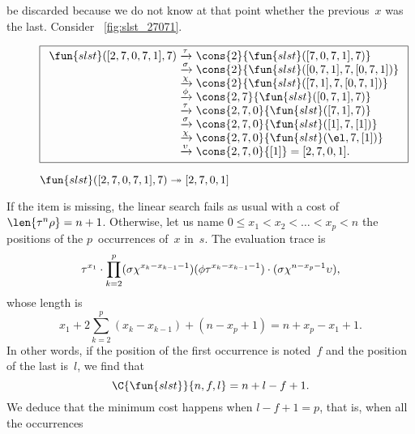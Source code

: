 be discarded because we do not know at that point whether the
previous~\(x\) was the last. Consider \fig~\vref{fig:slst_27071}.
\begin{figure}
\begin{equation*}
\boxed{%
\begin{array}{r@{\;}l@{\;}l}
\fun{slst}([2,7,0,7,1],7)
& \xrightarrow{\smash{\tau}}
& \cons{2}{\fun{slst}([7,0,7,1],7)}\\
& \xrightarrow{\smash{\sigma}}
& \cons{2}{\fun{slst}([0,7,1],7,[0,7,1])}\\
& \xrightarrow{\smash{\chi}}
& \cons{2}{\fun{slst}([7,1],7,[0,7,1])}\\
& \xrightarrow{\smash{\phi}}
& \cons{2,7}{\fun{slst}([0,7,1],7)}\\
& \xrightarrow{\smash{\tau}}
& \cons{2,7,0}{\fun{slst}([7,1],7)}\\
& \xrightarrow{\smash{\sigma}}
& \cons{2,7,0}{\fun{slst}([1],7,[1])}\\
& \xrightarrow{\smash{\chi}}
& \cons{2,7,0}{\fun{slst}(\el,7,[1])}\\
& \xrightarrow{\smash{\upsilon}}
& \cons{2,7,0}{[1]} = [2,7,0,1].
\end{array}}
\end{equation*}
\caption{\(\fun{slst}([2,7,0,7,1],7) \twoheadrightarrow [2,7,0,1]\)}
\label{fig:slst_27071}
\end{figure}
If the item is missing, the linear search fails as usual with a cost
of \(\len{\tau^n\rho} = n + 1\). Otherwise, let us name \( 0 \leqslant
x_1 < x_2 < \dots < x_p < n\) the positions of the \(p\)~occurrences
of~\(x\) in~\(s\). The evaluation trace is
\begin{equation*}
\abovedisplayskip=0pt
\belowdisplayskip=0pt
\tau^{x_1}
\cdot
\prod_{k=2}^{p}(\sigma\chi^{x_k-x_{k-1}-1})(\phi\tau^{x_k-x_{k-1}-1})
\cdot
(\sigma\chi^{n-x_p-1}\upsilon),
\end{equation*}
whose length is
\begin{equation*}
  x_1 + 2\sum_{k=2}^{p}(x_k-x_{k-1}) + (n - x_p + 1) = n + x_p - x_1 + 1.
\end{equation*}
In other words, if the position of the first
occurrence is noted~\(f\) and the position of the last is~\(l\), we
find that
\begin{equation*}
\C{\fun{slst}}{n,f,l} = n + l - f + 1.
\end{equation*}
We deduce that the minimum cost happens when \(l-f+1 = p\), that is, when all the occurrences

